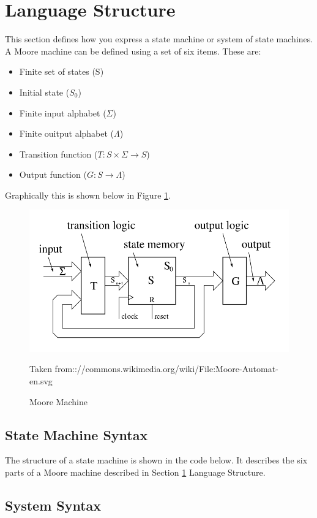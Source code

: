 \section{Language Structure}
\label{sec:LanguageStructure}
This section defines how you express a state machine or system of state
machines. A Moore machine can be defined using a set of six items. These are:

\begin{itemize}
   \item Finite set of states (S)
   \item Initial state ($S_0$)
   \item Finite input alphabet ($\Sigma$)
   \item Finite ouitput alphabet ($\Lambda$)
   \item Transition function ($T:S\times\Sigma\rightarrow S$)
   \item Output function ($G:S \rightarrow \Lambda$)
\end{itemize}

Graphically this is shown below in Figure \ref{fig:MooreMachine}.

\begin{figure}[h]
   \centering
   \includegraphics[scale=0.4]{MooreMachine}
   \caption{Moore Machine}
   \small{Taken from:://commons.wikimedia.org/wiki/File:Moore-Automat-en.svg}
   \label{fig:MooreMachine}
\end{figure}
\FloatBarrier

\subsection{State Machine Syntax}
The structure of a state machine is shown in the code below. It describes the
six parts of a Moore machine described in Section \ref{sec:LanguageStructure}
Language Structure.



\subsection{System Syntax}
